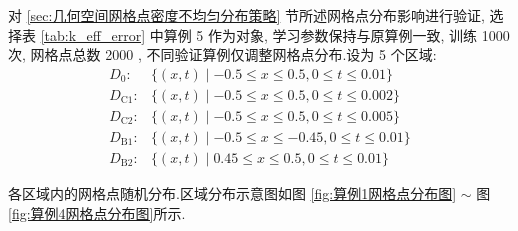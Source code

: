 \documentclass{Sichuan Normal University}
\begin{document}
对 \ref{sec:几何空间网格点密度不均匀分布策略} 节所述网格点分布影响进行验证, 选择表 \ref{tab:k_eff_error} 中算例 5 作为对象, 
学习参数保持与原算例一致, 训练 1000 次, 网格点总数 2000 , 不同验证算例仅调整网格点分布.设为 5 个区域:
$$
\begin{array}{ll}
D_0: & \{(x, t) \mid-0.5 \leqslant x \leqslant 0.5,0 \leqslant t \leqslant 0.01\} \\
D_{\mathrm{C} 1}: & \{(x, t) \mid-0.5 \leqslant x \leqslant 0.5,0 \leqslant t \leqslant 0.002\} \\
D_{\mathrm{C} 2}: & \{(x, t) \mid-0.5 \leqslant x \leqslant 0.5,0 \leqslant t \leqslant 0.005\} \\
D_{\mathrm{B} 1}: & \{(x, t) \mid-0.5 \leqslant x \leqslant-0.45,0 \leqslant t \leqslant 0.01\} \\
D_{\mathrm{B} 2}: & \{(x, t) \mid 0.45 \leqslant x \leqslant 0.5,0 \leqslant t \leqslant 0.01\}
\end{array}
$$

各区域内的网格点随机分布.区域分布示意图如图 \ref{fig:算例1网格点分布图} $\sim$ 图 \ref{fig:算例4网格点分布图}所示.
\end{document}
